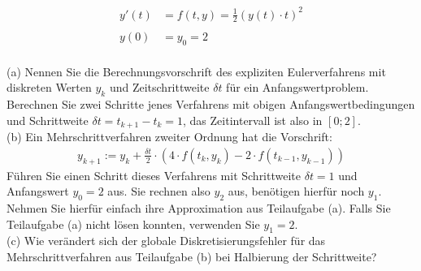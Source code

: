 \documentclass{scrartcl}
\begin{document}
\begin{align*}
y'(t) &= f(t,y) = \frac{1}{2}(y(t) \cdot t)^2 \\ \\
y(0) &= y_0 = 2
\end{align*}
\\
(a)
Nennen Sie die Berechnungsvorschrift des expliziten Eulerverfahrens mit diskreten Werten $y_k$ und Zeitschrittweite $\delta t$ für ein Anfangswertproblem.
\n 
Berechnen Sie zwei Schritte jenes Verfahrens mit obigen Anfangswertbedingungen und Schrittweite $\delta t = t_{k+1} - t_k = 1$, das Zeitintervall ist also in $[0;2]$.
\\
(b)
Ein Mehrschrittverfahren zweiter Ordnung hat die Vorschrift:
\begin{align*}
y_{k+1} := y_k + \frac{\delta t}{2} \cdot \left( 4\cdot f(t_k, y_k) - 2\cdot f(t_{k-1}, y_{k-1}) \right)
\end{align*}
Führen Sie einen Schritt dieses Verfahrens mit Schrittweite $\delta t = 1$ und Anfangswert $y_0 = 2$ aus. Sie rechnen also $y_2$ aus, benötigen hierfür noch $y_1$. Nehmen Sie hierfür einfach ihre Approximation aus Teilaufgabe (a). Falls Sie Teilaufgabe (a) nicht lösen konnten, verwenden Sie $y_1=2$.
\lbreak
\\
(c)
Wie verändert sich der globale Diskretisierungsfehler für das Mehrschrittverfahren aus Teilaufgabe (b) bei Halbierung der Schrittweite?
\end{document}
